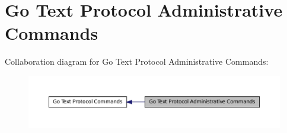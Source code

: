 \hypertarget{group___g_t_p___administrative___commands}{
\section{Go Text Protocol Administrative Commands}
\label{group___g_t_p___administrative___commands}
}


Collaboration diagram for Go Text Protocol Administrative Commands:\nopagebreak
\begin{figure}[H]
\begin{center}
\leavevmode
\includegraphics[width=400pt]{group___g_t_p___administrative___commands}
\end{center}
\end{figure}


